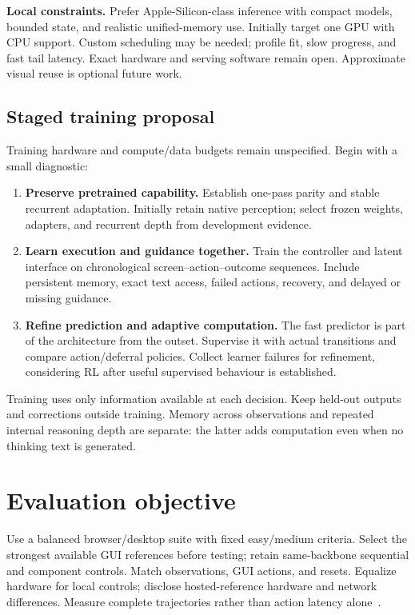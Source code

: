 \documentclass[11pt,letterpaper]{article}
\begin{document}
\textbf{Local constraints.} Prefer Apple-Silicon-class inference with compact models, bounded state, and realistic unified-memory use. Initially target one GPU with CPU support. Custom scheduling may be needed; profile fit, slow progress, and fast tail latency. Exact hardware and serving software remain open. Approximate visual reuse is optional future work.

\subsection{Staged training proposal}
Training hardware and compute/data budgets remain unspecified. Begin with a small diagnostic:
\begin{enumerate}
\item \textbf{Preserve pretrained capability.} Establish one-pass parity and stable recurrent adaptation. Initially retain native perception; select frozen weights, adapters, and recurrent depth from development evidence.
\item \textbf{Learn execution and guidance together.} Train the controller and latent interface on chronological screen--action--outcome sequences. Include persistent memory, exact text access, failed actions, recovery, and delayed or missing guidance.
\item \textbf{Refine prediction and adaptive computation.} The fast predictor is part of the architecture from the outset. Supervise it with actual transitions and compare action/deferral policies. Collect learner failures for refinement, considering RL after useful supervised behaviour is established.
\end{enumerate}
Training uses only information available at each decision. Keep held-out outputs and corrections outside training. Memory across observations and repeated internal reasoning depth are separate: the latter adds computation even when no thinking text is generated.

\section{Evaluation objective}
Use a balanced browser/desktop suite with fixed easy/medium criteria. Select the strongest available GUI references before testing; retain same-backbone sequential and component controls. Match observations, GUI actions, and resets. Equalize hardware for local controls; disclose hosted-reference hardware and network differences. Measure complete trajectories rather than action latency alone~\cite{speedrun}.
\end{document}
